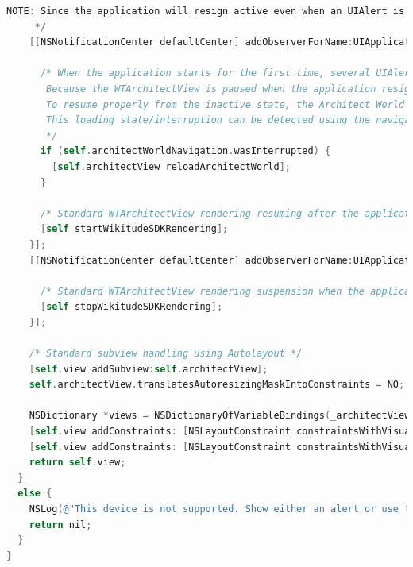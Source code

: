 \documentclass[thesis=M,english]{FITthesis}[2012/10/20]
\begin{document}
\begin{lstlisting}[language=C]
     NOTE: Since the application will resign active even when an UIAlert is shown, some special handling is implemented in the UIApplicationDidBecomeActiveNotification.
     */
    [[NSNotificationCenter defaultCenter] addObserverForName:UIApplicationDidBecomeActiveNotification object:nil queue:[NSOperationQueue mainQueue] usingBlock:^(NSNotification *note) {
      
      /* When the application starts for the first time, several UIAlert's might be shown to ask the user for camera and/or GPS access.
       Because the WTArchitectView is paused when the application resigns active (See line 86), also Architect JavaScript evaluation is interrupted.
       To resume properly from the inactive state, the Architect World has to be reloaded if and only if an active Architect World load request was active at the time the application resigned active.
       This loading state/interruption can be detected using the navigation object that was returned from the -loadArchitectWorldFromURL:withRequiredFeatures method.
       */
      if (self.architectWorldNavigation.wasInterrupted) {
        [self.architectView reloadArchitectWorld];
      }
      
      /* Standard WTArchitectView rendering resuming after the application becomes active again */
      [self startWikitudeSDKRendering];
    }];
    [[NSNotificationCenter defaultCenter] addObserverForName:UIApplicationWillResignActiveNotification object:nil queue:[NSOperationQueue mainQueue] usingBlock:^(NSNotification *note) {
      
      /* Standard WTArchitectView rendering suspension when the application resignes active */
      [self stopWikitudeSDKRendering];
    }];
    
    /* Standard subview handling using Autolayout */
    [self.view addSubview:self.architectView];
    self.architectView.translatesAutoresizingMaskIntoConstraints = NO;
    
    NSDictionary *views = NSDictionaryOfVariableBindings(_architectView);
    [self.view addConstraints: [NSLayoutConstraint constraintsWithVisualFormat:@"|[_architectView]|" options:0 metrics:nil views:views] ];
    [self.view addConstraints: [NSLayoutConstraint constraintsWithVisualFormat:@"V:|[_architectView]|" options:0 metrics:nil views:views] ];
    return self.view;
  }
  else {
    NSLog(@"This device is not supported. Show either an alert or use this class method even before presenting the view controller that manages the WTArchitectView. Error: %@", [deviceSupportError localizedDescription]);
    return nil;
  }
}


\end{lstlisting}
\end{document}
